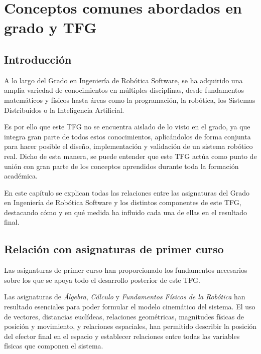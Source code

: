 \chapter{Conceptos comunes abordados en grado y TFG}
\label{cap:capitulo12}

\vspace{0.25cm}

\section{Introducción}
\label{sec:segundaseccion}

A lo largo del Grado en Ingeniería de Robótica Software, se ha adquirido una amplia variedad de conocimientos en múltiples disciplinas, desde fundamentos matemáticos y físicos hasta áreas como la programación, la robótica, los Sistemas Distribuidos o la Inteligencia Artificial.

\vspace{0.25cm}

Es por ello que este TFG no se encuentra aislado de lo visto en el grado, ya que integra gran parte de todos estos conocimientos, aplicándolos de forma conjunta para hacer posible el diseño, implementación y validación de un sistema robótico real. Dicho de esta manera, se puede entender que este TFG actúa como punto de unión con gran parte de los conceptos aprendidos durante toda la formación académica.

\vspace{0.25cm}

En este capítulo se explican todas las relaciones entre las asignaturas del Grado en Ingeniería de Robótica Software y los distintos componentes de este TFG, destacando cómo y en qué medida ha influido cada una de ellas en el resultado final.

\section{Relación con asignaturas de primer curso}
\label{sec:segundaseccion}

Las asignaturas de primer curso han proporcionado los fundamentos necesarios sobre los que se apoya todo el desarrollo posterior de este TFG.

\vspace{0.25cm}

Las asignaturas de \textit{Álgebra}, \textit{Cálculo} y \textit{Fundamentos Físicos de la Robótica}  han resultado esenciales para poder formular el modelo cinemático del sistema. El uso de vectores, distancias euclídeas, relaciones geométricas, magnitudes físicas de posición y movimiento, y relaciones espaciales, han permitido describir la posición del efector final en el espacio y establecer relaciones entre todas las variables físicas que componen el sistema.


